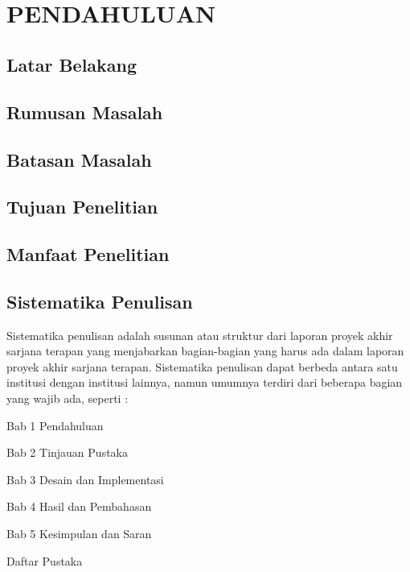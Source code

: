 \chapter[PENDAHULUAN]{\\ PENDAHULUAN}

\section{Latar Belakang}

\section{Rumusan Masalah}

\section{Batasan Masalah}

\section{Tujuan Penelitian}


\section{Manfaat Penelitian}



\section{Sistematika Penulisan}
Sistematika penulisan adalah susunan atau struktur dari laporan proyek akhir sarjana terapan yang menjabarkan bagian-bagian yang harus ada dalam laporan proyek akhir sarjana terapan. Sistematika penulisan dapat berbeda antara satu institusi dengan institusi lainnya, namun umumnya terdiri dari beberapa bagian yang wajib ada, seperti :

\begin{packed_item}
    \item Bab 1 Pendahuluan
    \item Bab 2 Tinjauan Pustaka
    \item Bab 3 Desain dan Implementasi
    \item Bab 4 Hasil dan Pembahasan
    \item Bab 5 Kesimpulan dan Saran
    \item Daftar Pustaka
\end{packed_item}

